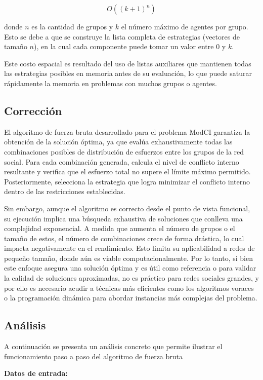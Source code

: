 \documentclass[11pt,letter]{article}
\begin{document}
    \[
            {O}\left((k+1)^n\right)
    \]

    donde $n$ es la cantidad de grupos y $k$ el número máximo de agentes por grupo. Esto se debe a que se construye la lista completa de estrategias (vectores de tamaño $n$), en la cual cada componente puede tomar un valor entre $0$ y $k$.

    Este costo espacial es resultado del uso de listas auxiliares que mantienen todas las estrategias posibles en memoria antes de su evaluación, lo que puede saturar rápidamente la memoria en problemas con muchos grupos o agentes.

    \subsection{Corrección}

    El algoritmo de fuerza bruta desarrollado para el problema ModCI garantiza la
    obtención de la solución óptima, ya que evalúa exhaustivamente todas las
    combinaciones posibles de distribución de esfuerzos entre los grupos de la red
    social. Para cada combinación generada, calcula el nivel de conflicto interno
    resultante y verifica que el esfuerzo total no supere el límite máximo permitido.
    Posteriormente, selecciona la estrategia que logra minimizar el conflicto interno
    dentro de las restricciones establecidas.

    Sin embargo, aunque el algoritmo es correcto desde el punto de vista funcional, su
    ejecución implica una búsqueda exhaustiva de soluciones que conlleva una
    complejidad exponencial. A medida que aumenta el número de grupos o el tamaño
    de estos, el número de combinaciones crece de forma drástica, lo cual impacta
    negativamente en el rendimiento. Esto limita su aplicabilidad a redes de pequeño
    tamaño, donde aún es viable computacionalmente.
    Por lo tanto, si bien este enfoque asegura una solución óptima y es útil como
    referencia o para validar la calidad de soluciones aproximadas, no es práctico para
    redes sociales grandes, y por ello es necesario acudir a técnicas más eficientes
    como los algoritmos voraces o la programación dinámica para abordar instancias
    más complejas del problema.

    \subsection{Análisis}

    A continuación se presenta un análisis concreto que permite ilustrar el funcionamiento paso a paso del algoritmo de fuerza bruta
    \par\vspace{1cm}
    \textbf{Datos de entrada:}
\end{document}
